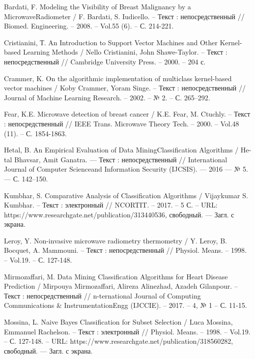 \newpage
{}
\begin{thebibliography}{3}
	 Bardati, F. Modeling the Visibility of Breast Malignancy by a MicrowaveRadiometer / F. Bardati, S. Iudicello. -- Текст : непосредственный // Biomed. Engineering. -- 2008. -- Vol.55 (6). -- С. 214-221.
	
	 Cristianini, Т. An Introduction to Support Vector Machines and Other Kernel-based Learning Methods / Nello Cristianini, John Shawe-Taylor. -- Текст : непосредственный // Cambridge University Press. -- 2000. -- 204 с.
	
	 Crammer, K. On the algorithmic implementation of multiclass kernel-based vector machines / Koby Crammer, Yoram Singe. -- Текст : непосредственный // Journal of Machine Learning Research. -- 2002. -- № 2. -- С. 265–292.
	
	 Fear, K.E. Microwave detection of breast cancer / K.E. Fear, M. Ctuchly. -- Текст : непосредственный // IEEE Trans. Microwave Theory Tech. -- 2000. -- Vol.48 (11). -- С. 1854-1863.
	
	 Hetal, B. An Empirical Evaluation of Data MiningClassification Algorithms / He-tal Bhavsar, Amit Ganatra. — Текст : непосредственный // International Journal of Computer Scienceand Information Security (IJCSIS). — 2016 — № 5. — С. 142–150. 
	
	 Kumbhar, S. Comparative Analysis of Classification Algorithms / Vijaykumar S. Kumbhar. -- Текст : электронный // NCORTIT. -- 2017. -- 5 С. -- URL: https://www.researchgate.net/publication/313440536, свободный. — Загл. с экрана.
	
	 Leroy, Y. Non-invasive microwave radiometry thermometry / Y. Leroy, B. Bocquet, A. Mammouni. -- Текст : непосредственный // Physiol. Means. -- 1998. -- Vol.19. -- С. 127-148.
	
	 Mirmozaffari, M. Data Mining Classification Algorithms for Heart Disease Prediction / Mirpouya Mirmozaffari, Alireza Alinezhad, Azadeh Gilanpour. -- Текст : непосредственный // n-ternational Journal of Computing Communications \& InstrumentationEngg (IJCCIE). -- 2017. -- 4, № 1 -- С. 11-15.
	
	 Mossina, L. Naive Bayes Classification for Subset Selection / Luca Mossina, Emmanuel Rachelson. -- Текст : электронный // Physiol. Means. -- 1998. -- Vol.19. -- С. 127-148. -- URL: https://www.researchgate.net/publication/318560282, свободный. — Загл. с экрана.
	

\end{thebibliography}
